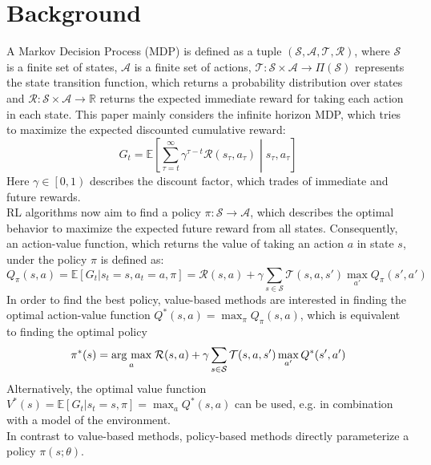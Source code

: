     \section{Background}
    A Markov Decision Process (MDP) is defined as a tuple $(\mathcal{S}, \mathcal{A}, \mathcal{T},\mathcal{R})$, where $\mathcal{S}$ is a finite set of states, $\mathcal{A}$ is a finite set of actions, $\mathcal{T}:\mathcal{S} \times \mathcal{A} \rightarrow \Pi(\mathcal{S})$ represents the state transition function, which returns a probability distribution over states and 
    $\mathcal{R}:\mathcal{S} \times \mathcal{A} \rightarrow \mathbb{R}$ returns the expected immediate reward for taking each action in each state. 
    This paper mainly considers the infinite horizon MDP, which tries to maximize the expected discounted cumulative reward:
    \[
    G_t = \mathbb{E} \left[ \sum_{\tau=t}^{\infty} \gamma^{\tau-t} \mathcal{R}(s_\tau,a_\tau)\middle|s_\tau,a_\tau \right]
	\]
    Here $\gamma \in \left[0,1\right)$ describes the discount factor, which trades of immediate and future rewards.\\
    RL algorithms now aim to find a policy $\pi:\mathcal{S} \rightarrow \mathcal{A}$, which describes the optimal behavior to maximize the expected future reward from all states.
    Consequently, an action-value function, which returns the value of taking an action $a$ in state $s$, under the policy $\pi$ is defined as:
    \[
    Q_\pi(s,a) = \mathbb{E}\left[G_t|s_t =s,a_t=a,\pi\right] = \mathcal{R}(s,a) + \gamma \sum_{s\in\mathcal{S}}\mathcal{T}(s,a,s') \max_{a'}Q_\pi(s',a')
	\]
    In order to find the best policy, value-based methods are interested in finding the optimal action-value function $Q^*(s,a) =\max_\pi Q_\pi(s,a)$, which is equivalent to finding the optimal policy 
    \[
	\pi^*(s) = \underset{a}{\operatorname{arg}\,\operatorname{max}}\; \mathcal{R}(s,a) + \gamma \sum_{s\in\mathcal{S}}\mathcal{T}(s,a,s') \max_{a'}Q^*(s',a')
    \]
    Alternatively, the optimal value function $V^*(s) = \mathbb{E}\left[G_t|s_t=s, \pi\right] = \max_{a} Q^*(s,a)$ can be used, e.g. in combination with a model of the environment.\\
    In contrast to value-based methods, policy-based methods directly parameterize a policy $\pi(s;\theta)$. 

